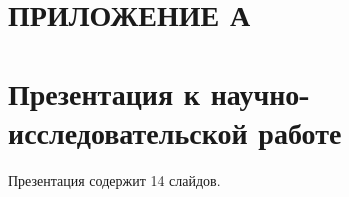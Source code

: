 \section*{\centering ПРИЛОЖЕНИЕ А}

\section*{Презентация к научно-исследовательской работе}
Презентация содержит 14 слайдов.